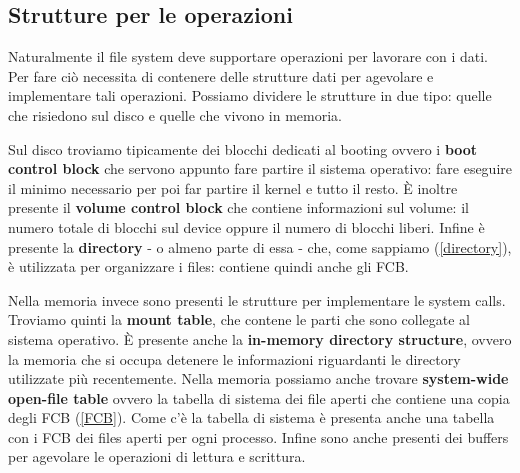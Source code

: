 % 
\subsection{Strutture per le operazioni}
Naturalmente il file system deve supportare operazioni per lavorare con i dati. Per fare ciò necessita di contenere delle strutture dati per agevolare e implementare tali operazioni. Possiamo dividere le strutture in due tipo: quelle che risiedono sul disco e quelle che vivono in memoria. 

Sul disco troviamo tipicamente dei blocchi dedicati al booting ovvero i \textbf{boot control block} che servono appunto fare partire il sistema operativo: fare eseguire il minimo necessario per poi far partire il kernel e tutto il resto. È inoltre presente il \textbf{volume control block} che contiene informazioni sul volume: il numero totale di blocchi sul device oppure il numero di blocchi liberi. Infine è presente la \textbf{directory} - o almeno parte di essa - che, come sappiamo (\ref{directory}), è utilizzata per organizzare i files: contiene quindi anche gli FCB.

Nella memoria invece sono presenti le strutture per implementare le system calls. Troviamo quinti la \textbf{mount table}, che contene le parti che sono collegate al sistema operativo. È presente anche la \textbf{in-memory directory structure}, ovvero la memoria che si occupa detenere le informazioni riguardanti le directory utilizzate più recentemente. Nella memoria possiamo anche trovare \textbf{system-wide open-file table} ovvero la tabella di sistema dei file aperti che contiene una copia degli FCB (\ref{FCB}). Come c'è la tabella di sistema è presenta anche una tabella con i FCB dei files aperti per ogni processo. Infine sono anche presenti dei buffers per agevolare le operazioni di lettura e scrittura.

% 

